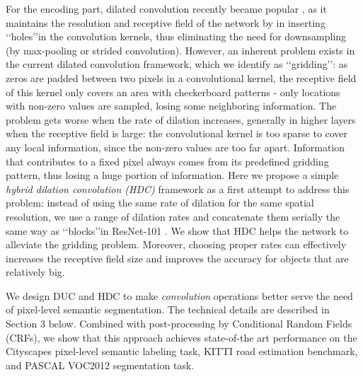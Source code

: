 \documentclass[10pt,twocolumn,letterpaper]{article}
\begin{document}
For the encoding part, dilated convolution recently became popular \cite{chen2016deeplab,yu2015multi,wu2016high,zhou2016semantic}, as it maintains the resolution and receptive field of the network by in inserting \lq\lq holes\rq\rq in the convolution kernels, thus eliminating the need for downsampling (by max-pooling or strided convolution). However, an inherent problem exists in the current dilated convolution framework, which we identify as \lq\lq gridding\rq\rq: as zeros are padded between two pixels in a convolutional kernel, the receptive field of this kernel only covers an area with checkerboard patterns - only locations with non-zero values are sampled, losing some neighboring information. The problem gets worse when the rate of dilation increases, generally in higher layers when the receptive field is large: the convolutional kernel is too sparse to cover any local information, since the non-zero values are too far apart. Information that contributes to a fixed pixel always comes from its predefined gridding pattern, thus losing a huge portion of information. Here we propose a simple \textit{hybrid dilation convolution (HDC)} framework as a first attempt to address this problem: instead of using the same rate of dilation for the same spatial resolution, we use a range of dilation rates and concatenate them serially the same way as \lq\lq blocks\rq\rq in ResNet-101 \cite{he2015deep}. We show that HDC helps the network to alleviate the gridding problem. Moreover, choosing proper rates can effectively increases the receptive field size and improves the accuracy for objects that are relatively big.

We design DUC and HDC to make \textit{convolution} operations better serve the need of pixel-level semantic segmentation. The technical details are described in Section 3 below. Combined with post-processing by Conditional Random Fields (CRFs), we show that this approach achieves state-of-the art performance on the Cityscapes pixel-level semantic labeling task, KITTI road estimation benchmark, and PASCAL VOC2012 segmentation task.
\end{document}
